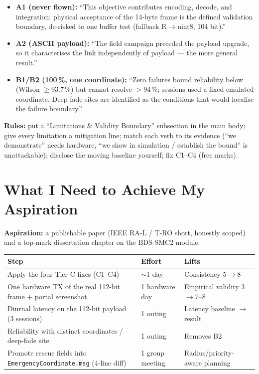 \documentclass[11pt,a4paper]{article}
\begin{document}
\begin{itemize}[leftmargin=1.4em,itemsep=2pt]
  \item \textbf{A1 (never flown):} ``This objective contributes encoding, decode, and
        integration; physical acceptance of the 14-byte frame is the defined validation
        boundary, de-risked to one buffer test (fallback R$\to$uint8, 104 bit).''
  \item \textbf{A2 (ASCII payload):} ``The field campaign preceded the payload upgrade, so it
        characterises the link independently of payload --- the more general result.''
  \item \textbf{B1/B2 (100\,\%, one coordinate):} ``Zero failures bound reliability below
        (Wilson $\ge$93.7\,\%) but cannot resolve $>$94\,\%; sessions used a fixed emulated
        coordinate. Deep-fade sites are identified as the conditions that would localise the
        failure boundary.''
\end{itemize}

\textbf{Rules:} put a ``Limitations \& Validity Boundary'' subsection in the main body; give
every limitation a mitigation line; match each verb to its evidence (``we demonstrate''
needs hardware, ``we show in simulation / establish the bound'' is unattackable); disclose
the moving baseline yourself; fix C1--C4 (free marks).

\section{What I Need to Achieve My Aspiration}

\textbf{Aspiration:} a publishable paper (IEEE RA-L / T-RO short, honestly scoped) and a
top-mark dissertation chapter on the BDS-SMC2 module.

\begin{longtable}{@{}p{6.6cm} p{2.8cm} p{4.0cm}@{}}
\toprule
\textbf{Step} & \textbf{Effort} & \textbf{Lifts} \\
\midrule
\endhead
Apply the four Tier-C fixes (C1--C4) & $\sim$1 day & Consistency 5$\to$8 \\
One hardware TX of the real 112-bit frame + portal screenshot & 1 hardware day & Empirical validity 3$\to$7--8 \\
Diurnal latency on the 112-bit payload (3 sessions) & 1 outing & Latency baseline $\to$ result \\
Reliability with distinct coordinates / deep-fade site & 1 outing & Removes B2 \\
Promote rescue fields into \texttt{EmergencyCoordinate.msg} (4-line diff) & 1 group meeting & Radius/priority-aware planning \\
\bottomrule
\end{longtable}
\end{document}
